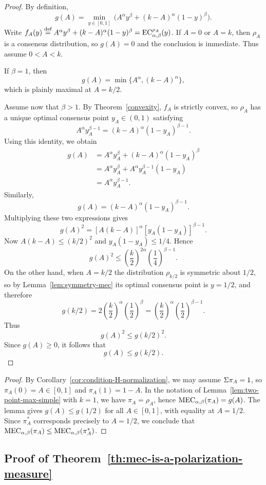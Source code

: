 \begin{proof}
By definition,
\[
g(A)=\min_{y\in[0,1]}\,\bigl(A^\alpha y^\beta +(k-A)^\alpha(1-y)^\beta\bigr).
\]
Write $f_A(y)\defsymbol A^\alpha y^\beta +(k-A)^\alpha(1-y)^\beta=\EC[\alpha,\beta][\rho_A](y)$. If \(A=0\) or \(A=k\), then $\rho_A$ is a consensus distribution, so \(g(A)=0\) and the conclusion is immediate. Thus assume \(0<A<k\).

If \(\beta=1\), then
\[
g(A)=\min\{A^\alpha,(k-A)^\alpha\},
\]
which is plainly maximal at \(A=k/2\).

Assume now that \(\beta>1\). By Theorem~\ref{convexity}, $f_A$ is strictly convex, so $\rho_A$ has a unique optimal consensus point \(y_A\in(0,1)\) satisfying
\[
A^\alpha y_A^{\beta-1}=(k-A)^\alpha(1-y_A)^{\beta-1}.
\]
Using this identity, we obtain
\[
\begin{aligned}
g(A)
&=A^\alpha y_A^\beta +(k-A)^\alpha(1-y_A)^\beta \\
&=A^\alpha y_A^\beta + A^\alpha y_A^{\beta-1}(1-y_A) \\
&=A^\alpha y_A^{\beta-1}.
\end{aligned}
\]
Similarly,
\[
g(A)=(k-A)^\alpha(1-y_A)^{\beta-1}.
\]
Multiplying these two expressions gives
\[
g(A)^2=[A(k-A)]^\alpha [y_A(1-y_A)]^{\beta-1}.
\]
Now \(A(k-A)\le (k/2)^2\) and \(y_A(1-y_A)\le 1/4\). Hence
\[
g(A)^2
\le
\left(\frac{k}{2}\right)^{2\alpha}\left(\frac14\right)^{\beta-1}.
\]
On the other hand, when \(A=k/2\) the distribution $\rho_{k/2}$ is symmetric about $1/2$, so by Lemma~\ref{lem:symmetry-mec} its optimal consensus point is $y=1/2$, and therefore
\[
g(k/2)
=
2\left(\frac{k}{2}\right)^\alpha \left(\frac12\right)^\beta
=
\left(\frac{k}{2}\right)^\alpha \left(\frac12\right)^{\beta-1}.
\]
Thus
\[
g(A)^2\le g(k/2)^2.
\]
Since \(g(A)\ge 0\), it follows that
\[
g(A)\le g(k/2).
\]
\end{proof}

\twoPointPolarization*
\begin{proof}
By Corollary~\ref{cor:condition-H-normalization}, we may assume $\Sigma \pi_A=1$, so $\pi_A(0)=A\in[0,1]$ and $\pi_A(1)=1-A$. In the notation of Lemma~\ref{lem:two-point-max-simple} with $k=1$, we have $\pi_A=\rho_A$, hence $\MEC(\pi_A)=g(A)$. The lemma gives $g(A)\le g(1/2)$ for all $A\in[0,1]$, with equality at $A=1/2$. Since $\pi_A^*$ corresponds precisely to $A=1/2$, we conclude that $\MEC(\pi_A)\le \MEC(\pi_A^*)$.
\end{proof}

\subsection{Proof of Theorem~\ref{th:mec-is-a-polarization-measure}}

